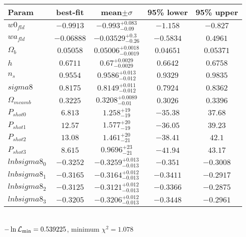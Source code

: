 \begin{tabular}{|l|c|c|c|c|} 
 \hline 
Param & best-fit & mean$\pm\sigma$ & 95\% lower & 95\% upper \\ \hline 
$w0_{fld }$ &$-0.9913$ & $-0.993_{-0.09}^{+0.083}$ & $-1.158$ & $-0.827$ \\ 
$wa_{fld }$ &$-0.06888$ & $-0.03529_{-0.26}^{+0.3}$ & $-0.5834$ & $0.4961$ \\ 
$\Omega{}_{b }$ &$0.05058$ & $0.05006_{-0.0019}^{+0.0018}$ & $0.04651$ & $0.05371$ \\ 
$h$ &$0.6711$ & $0.67_{-0.0029}^{+0.0029}$ & $0.6642$ & $0.6758$ \\ 
$n_{s }$ &$0.9554$ & $0.9586_{-0.012}^{+0.013}$ & $0.9329$ & $0.9835$ \\ 
$sigma8$ &$0.8175$ & $0.8149_{-0.012}^{+0.011}$ & $0.7924$ & $0.8362$ \\ 
$\Omega{}_{m camb }$ &$0.3225$ & $0.3208_{-0.01}^{+0.0089}$ & $0.3026$ & $0.3396$ \\ 
$P_{shot0 }$ &$6.813$ & $1.258_{-19}^{+19}$ & $-35.38$ & $37.68$ \\ 
$P_{shot1 }$ &$12.57$ & $1.577_{-19}^{+20}$ & $-36.05$ & $39.23$ \\ 
$P_{shot2 }$ &$13.08$ & $1.461_{-21}^{+20}$ & $-38.41$ & $42.1$ \\ 
$P_{shot3 }$ &$8.615$ & $0.9696_{-21}^{+23}$ & $-41.94$ & $43.17$ \\ 
$lnbsigma8_{0 }$ &$-0.3252$ & $-0.3259_{-0.013}^{+0.013}$ & $-0.351$ & $-0.3008$ \\ 
$lnbsigma8_{1 }$ &$-0.3165$ & $-0.3164_{-0.013}^{+0.012}$ & $-0.3411$ & $-0.2917$ \\ 
$lnbsigma8_{2 }$ &$-0.3125$ & $-0.3121_{-0.013}^{+0.012}$ & $-0.3366$ & $-0.2875$ \\ 
$lnbsigma8_{3 }$ &$-0.3205$ & $-0.3206_{-0.013}^{+0.012}$ & $-0.3448$ & $-0.2961$ \\ 
\hline 
 \end{tabular} \\ 
$-\ln{\cal L}_\mathrm{min} =0.539225$, minimum $\chi^2=1.078$ \\ 
